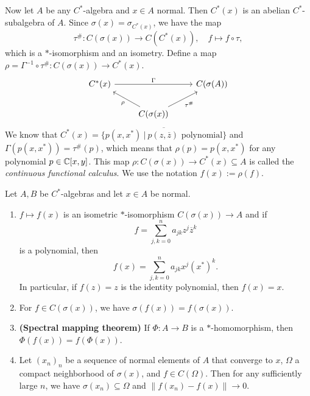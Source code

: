 Now let $A$ be any $C^*$-algebra and $x \in A$ normal. 
Then $C^* (x)$ is an abelian $C^*$-subalgebra of $A$. Since $\sigma (x) = \sigma_{C^* (x)}$, we have the map 
$$\tau^{\#}: C(\sigma (x)) \to C(C^* (x)),\quad f \mapsto f \circ \tau,$$
which is a $*$-isomorphism and an isometry. Define a map $\rho = \Gamma^{-1} \circ \tau^{\#}: C(\sigma(x)) \to C^*(x)$.
\[\begin{tikzcd}
	{C^*(x)} && {C(\sigma(A))} \\
	& {C(\sigma(x))}
	\arrow["{\tau^{\#}}"', from=2-2, to=1-3]
	\arrow["\rho", from=2-2, to=1-1]
	\arrow["\Gamma", from=1-1, to=1-3]
\end{tikzcd}\]
We know that $C^*(x) = \overline{\{p(x, x^*)\ |\ \textrm{$p (z, \overline{z})$ polynomial}\}}$
and $\Gamma (p(x, x^*)) = \tau^{\#} (p)$, which means that $\rho (p) = p(x, x^*)$ for any polynomial $p \in \mathbb {C}[x, y]$.
This map $\rho: C(\sigma(x)) \to C^*(x) \subseteq A$ is called the \emph{continuous functional calculus}.
We use the notation $f(x) := \rho(f)$. 

\begin{theorem}
  Let $A, B$ be $C^*$-algebras and let $x \in A$ be normal.
  \begin{enumerate}
    \item $f \mapsto f(x)$ is an isometric $*$-isomorphism $C(\sigma(x)) \to A$ and if 
    $$f = \sum_{j, k = 0} ^n a_{jk} z^j \overline{z}^k$$ is a polynomial, then 
    $$f(x) = \sum_{j, k = 0} ^n a_{jk} x^j (x^*)^k.$$
    In particular, if $f(z) = z$ is the identity polynomial, then $f(x) = x$.
    \item For $f \in C(\sigma(x))$, we have $\sigma(f(x)) = f(\sigma(x))$.
    \item \textbf{(Spectral mapping theorem)} If $\Phi: A \to B$ is a $*$-homomorphism, then $\Phi(f(x)) = f(\Phi(x))$.
    \item Let $(x_n)_n$ be a sequence of normal elements of $A$ that converge to $x$,
    $\Omega$ a compact neighborhood of $\sigma(x)$, and $f \in C(\Omega)$. Then for any
    sufficiently large $n$, we have $\sigma(x_n) \subseteq \Omega$ and $\|f(x_n) - f(x)\| \to 0$.
  \end{enumerate}
\end{theorem}

